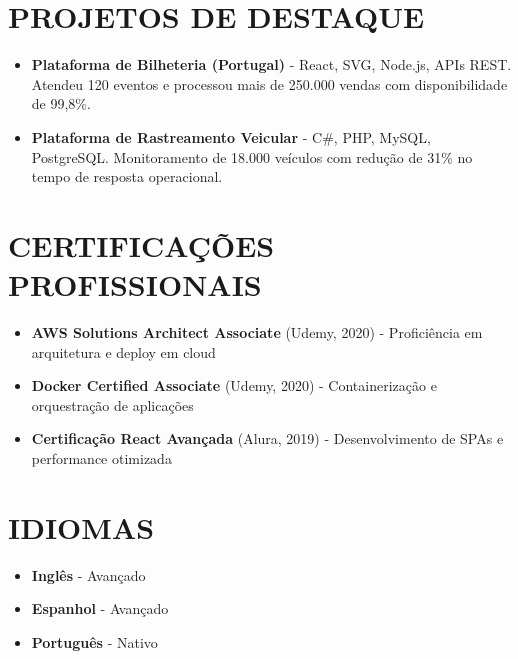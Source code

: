 \documentclass[11pt,a4paper]{article}
\begin{document}
\vspace{15pt}

\section{PROJETOS DE DESTAQUE}

\begin{itemize}[leftmargin=20pt, topsep=0pt, itemsep=2pt]
    \item \textbf{Plataforma de Bilheteria (Portugal)} - React, SVG, Node.js, APIs REST. Atendeu 120 eventos e processou mais de 250.000 vendas com disponibilidade de 99,8\%.
    \item \textbf{Plataforma de Rastreamento Veicular} - C\#, PHP, MySQL, PostgreSQL. Monitoramento de 18.000 veículos com redução de 31\% no tempo de resposta operacional.
\end{itemize}

\vspace{15pt}

\section{CERTIFICAÇÕES PROFISSIONAIS}

\begin{itemize}[leftmargin=20pt, topsep=0pt, itemsep=2pt]
    \item \textbf{AWS Solutions Architect Associate} (Udemy, 2020) - Proficiência em arquitetura e deploy em cloud
    \item \textbf{Docker Certified Associate} (Udemy, 2020) - Containerização e orquestração de aplicações
    \item \textbf{Certificação React Avançada} (Alura, 2019) - Desenvolvimento de SPAs e performance otimizada
\end{itemize}

\vspace{15pt}

\section{IDIOMAS}

\begin{itemize}[leftmargin=20pt, topsep=0pt, itemsep=2pt]
    \item \textbf{Inglês} - Avançado
    \item \textbf{Espanhol} - Avançado
    \item \textbf{Português} - Nativo
\end{itemize}
\end{document}
